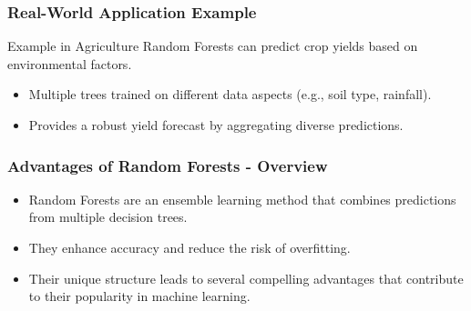 \documentclass[aspectratio=169]{beamer}
\begin{document}
\begin{frame}[fragile]
    \frametitle{Real-World Application Example}
    \begin{block}{Example in Agriculture}
        Random Forests can predict crop yields based on environmental factors. 
        \begin{itemize}
            \item Multiple trees trained on different data aspects (e.g., soil type, rainfall).
            \item Provides a robust yield forecast by aggregating diverse predictions.
        \end{itemize}
    \end{block}
\end{frame}

\begin{frame}[fragile]
    \frametitle{Advantages of Random Forests - Overview}
    \begin{itemize}
        \item Random Forests are an ensemble learning method that combines predictions from multiple decision trees.
        \item They enhance accuracy and reduce the risk of overfitting.
        \item Their unique structure leads to several compelling advantages that contribute to their popularity in machine learning.
    \end{itemize}
\end{frame}
\end{document}
